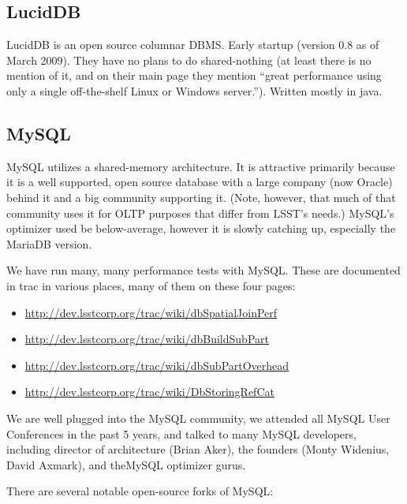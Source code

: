 \documentclass[DM,lsstdraft,toc]{lsstdoc}
\begin{document}
\subsection{LucidDB}\label{luciddb}

LucidDB is an open source columnar DBMS. Early startup (version 0.8 as
of March 2009). They have no plans to do shared-nothing (at least there
is no mention of it, and on their main page they mention ``great
performance using only a single off-the-shelf Linux or Windows
server.''). Written mostly in java.

\subsection{MySQL}\label{mysql-1}

MySQL utilizes a shared-memory architecture. It is attractive primarily
because it is a well supported, open source database with a large
company (now Oracle) behind it and a big community supporting it. (Note,
however, that much of that community uses it for OLTP purposes that
differ from LSST's needs.) MySQL's optimizer used be below-average,
however it is slowly catching up, especially the MariaDB version.

We have run many, many performance tests with MySQL. These are
documented in trac in various places, many of them on these four pages:

\begin{itemize}
\item
  \url{http://dev.lsstcorp.org/trac/wiki/dbSpatialJoinPerf}
\item
  \url{http://dev.lsstcorp.org/trac/wiki/dbBuildSubPart}
\item
  \url{http://dev.lsstcorp.org/trac/wiki/dbSubPartOverhead}
\item
  \url{http://dev.lsstcorp.org/trac/wiki/DbStoringRefCat}
\end{itemize}

We are well plugged into the MySQL community, we attended all MySQL User
Conferences in the past 5 years, and talked to many MySQL developers,
including director of architecture (Brian Aker), the founders (Monty
Widenius, David Axmark), and theMySQL optimizer gurus.

There are several notable open-source forks of MySQL:
\end{document}

